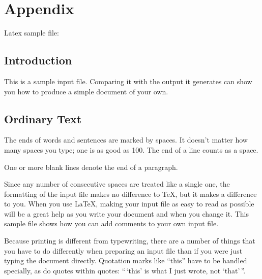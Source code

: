 
\chapter{Appendix}

Latex sample file:  

\section{Introduction}
This is a sample input file.  Comparing it with the output it
generates can show you how to produce a simple document of
your own.

\section{Ordinary Text}  %

The ends  of words and sentences are marked 
  by   spaces. It  doesn't matter how many 
spaces    you type; one is as good as 100.  The
end of   a line counts as a space.

One   or more   blank lines denote the  end 
of  a paragraph.  

Since any number of consecutive spaces are treated like a single
one, the formatting of the input file makes no difference to
      \TeX,         %
but it makes a difference to you.  
When you use
      \LaTeX,       %
making your input file as easy to read as possible
will be a great help as you write your document and when you
change it.  This sample file shows how you can add comments to
your own input file.

Because printing is different from typewriting, there are a 
number of things that you have to do differently when preparing 
an input file than if you were just typing the document directly.  
Quotation marks like 
       ``this'' 
have to be handled specially, as do quotes within quotes: 
       ``\,`this'                  %
        is what I just 
        wrote, not  `that'\,''.  

